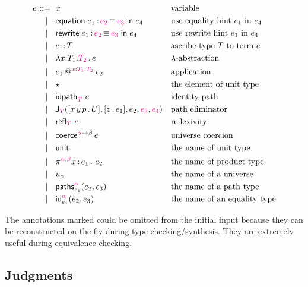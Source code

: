 \documentclass{article}
\begin{document}
\begin{equation*}
  e
  \begin{aligned}[t]
    \ \mathrel{{:}{:}{=}}\    {}&  x   &&\text{variable} \\
    \ \mid\ \  {}&  \mathsf{equation}\; e_1 \,{:}\, {\color{magenta}{e_2}} \,{\equiv}\, {\color{magenta}{e_3}} \; \mathsf{in} \; e_4 &&\text{use equality hint $e_1$ in $e_4$} \\
    \ \mid\ \  {}&  \mathsf{rewrite}\; e_1 \,{:}\, {\color{magenta}{e_2}} \,{\equiv}\, {\color{magenta}{e_3}} \; \mathsf{in} \; e_4 &&\text{use rewrite hint $e_1$ in $e_4$} \\
    \ \mid\ \  {}&  e \,{:}{:}\, T  &&\text{ascribe type $T$ to term $e$} \\
    \ \mid\ \  {}&  \lambda x {:} T_1.{{\color{magenta}{T_2}}}\,.\, e  &&\text{$\lambda$-abstraction} \\
    \ \mid\ \  {}&  e_1\mathbin{@^{{\color{magenta}{x}}{:}{\color{magenta}{T_1}}.{\color{magenta}{T_2}}}} e_2  &&\text{application} \\
    \ \mid\ \  {}&  \star  &&\text{the element of unit type} \\
    \ \mid\ \  {}&  {\mathsf{idpath}_{{\color{magenta}{T}}}}\ {e}  &&\text{identity path} \\
    \ \mid\ \  {}&  \mathsf{J}_{{\color{magenta}{T}}}([x\,y\,p \,.\, U], [z \,.\, e_1], e_2, {\color{magenta}{e_3}}, {\color{magenta}{e_4}})  &&\text{path eliminator} \\
    \ \mid\ \  {}&  {\mathsf{refl}_{{\color{magenta}{T}}}}\  e  &&\text{reflexivity} \\
    \ \mid\ \  {}&  \mathsf{coerce}^{{\color{magenta}{\alpha}}{\mapsto}\beta} \, e  &&\text{universe coercion} \\
    \ \mid\ \  {}&  \mathsf{unit}  &&\text{the name of unit type} \\
    \ \mid\ \  {}&  \pi^{{\color{magenta}{\alpha}},{\color{magenta}{\beta}}} x\,{:}\,e_1 \,.\  e_2  &&\text{the name of product type} \\
    \ \mid\ \  {}&  u_{\alpha} &&\text{the name of a universe} \\
    \ \mid\ \  {}&  \mathsf{paths}^{{\color{magenta}{\alpha}}}_{e_1}(e_2,e_3)  &&\text{the name of a path type} \\
    \ \mid\ \  {}&  \mathsf{id}^{{\color{magenta}{\alpha}}}_{e_1}(e_2,e_3)  &&\text{the name of an equality type}
  \end{aligned}
\end{equation*}

The annotations marked {} could be omitted from the initial input because they
can be reconstructed on the fly during type checking/synthesis. They are extremely useful during
equivalence checking.

\subsection{Judgments}
\label{sec:algorithmic-judgments}
\end{document}
